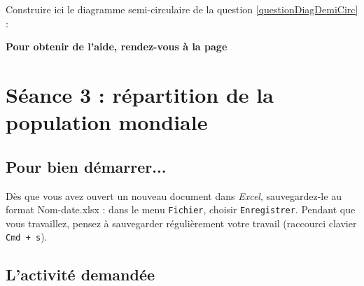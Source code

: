 
Construire ici le diagramme semi-circulaire de la question \ref{questionDiagDemiCirc}   :


\textbf{Pour obtenir de l'aide, rendez-vous à la page \pageref{Tableur5eOutils}}



\vfill


\phantom{rien} 




%
%
%
%

\newpage


\section{Séance 3 : répartition de la population mondiale}\label{ficheTableur5e3}

\subsection{Pour bien démarrer...}

Dès que vous avez ouvert un nouveau document dans \emph{Excel}, sauvegardez-le au format Nom-date.xlsx : dans le menu \texttt{Fichier}, choisir \texttt{Enregistrer}. Pendant que vous travaillez, pensez à sauvegarder régulièrement votre travail (raccourci clavier \texttt{Cmd + s}).   



\subsection{L'activité demandée}


